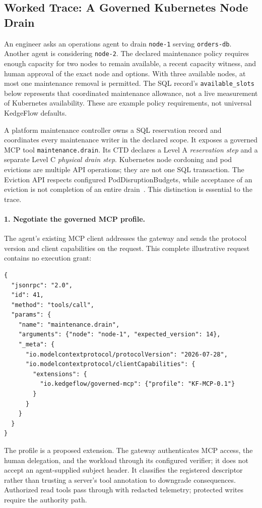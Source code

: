 

\subsection{Worked Trace: A Governed Kubernetes Node Drain}
\label{sec:worked-slice}
An engineer asks an operations agent to drain \texttt{node-1} serving \texttt{orders-db}. Another agent is considering \texttt{node-2}. The declared maintenance policy requires enough capacity for two nodes to remain available, a recent capacity witness, and human approval of the exact node and options. With three available nodes, at most one maintenance removal is permitted. The SQL record's \texttt{available\_slots} below represents that coordinated maintenance allowance, not a live measurement of Kubernetes availability. These are example policy requirements, not universal KedgeFlow defaults.

A platform maintenance controller owns a SQL reservation record and coordinates every maintenance writer in the declared scope. It exposes a governed MCP tool \texttt{maintenance.drain}. Its CTD declares a Level A \emph{reservation step} and a separate Level C \emph{physical drain step}. Kubernetes node cordoning and pod evictions are multiple API operations; they are not one SQL transaction. The Eviction API respects configured PodDisruptionBudgets, while acceptance of an eviction is not completion of an entire drain~\cite{kubernetesdrain2026,kuberneteseviction2026}. This distinction is essential to the trace.

\paragraph{1. Negotiate the governed MCP profile.}
The agent's existing MCP client addresses the gateway and sends the protocol version and client capabilities on the request. This complete illustrative request contains no execution grant:
\begin{lstlisting}
{
  "jsonrpc": "2.0",
  "id": 41,
  "method": "tools/call",
  "params": {
    "name": "maintenance.drain",
    "arguments": {"node": "node-1", "expected_version": 14},
    "_meta": {
      "io.modelcontextprotocol/protocolVersion": "2026-07-28",
      "io.modelcontextprotocol/clientCapabilities": {
        "extensions": {
          "io.kedgeflow/governed-mcp": {"profile": "KF-MCP-0.1"}
        }
      }
    }
  }
}
\end{lstlisting}
The profile is a proposed extension. The gateway authenticates MCP access, the human delegation, and the workload through its configured verifier; it does not accept an agent-supplied subject header. It classifies the registered descriptor rather than trusting a server's tool annotation to downgrade consequences. Authorized read tools pass through with redacted telemetry; protected writes require the authority path.

